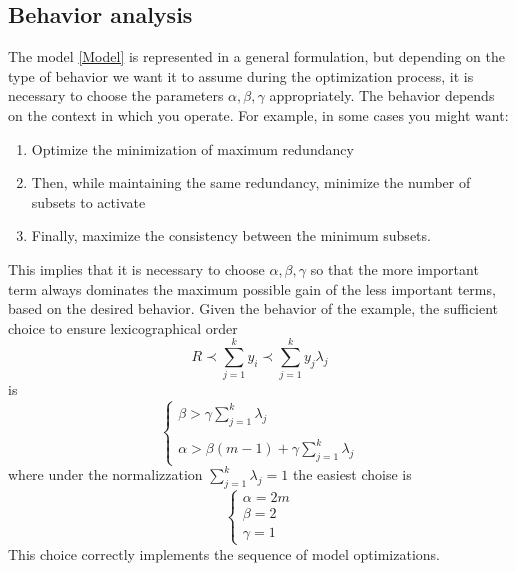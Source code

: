 \documentclass[10pt]{article} %
\begin{document}
\subsection{Behavior analysis}
The model \ref{Model} is represented in a general formulation, but depending on the type of behavior we want it to assume during the optimization process, it is necessary to choose the parameters $\alpha, \beta, \gamma$ appropriately. The behavior depends on the context in which you operate. For example, in some cases you might want:
\begin{enumerate}
    \item Optimize the minimization of maximum redundancy
    \item Then, while maintaining the same redundancy, minimize the number of subsets to activate
    \item Finally, maximize the consistency between the minimum subsets.
\end{enumerate}
This implies that it is necessary to choose $\alpha, \beta, \gamma$ so that the more important term always dominates the maximum possible gain of the less important terms, based on the desired behavior. Given the behavior of the example, the sufficient choice to ensure lexicographical order
\begin{equation}
    R \prec \sum_{j=1}^{k} y_{i} \prec \sum_{j=1}^{k} y_{j}\lambda_{j}
\end{equation}
is
\begin{equation}
    \begin{cases}
    \beta >  \gamma \sum_{j=1}^{k} \lambda_{j} \\\\
    \alpha > \beta(m-1) +\gamma\sum_{j=1}^{k} \lambda_{j}
\end{cases}
\end{equation}
where under the normalizzation $\sum_{j=1}^{k}\lambda _{j} = 1$ the easiest choise is
\begin{equation}
    \begin{cases}
        \alpha = 2m \\
        \beta = 2 \\
        \gamma = 1
    \end{cases}
\end{equation}
This choice correctly implements the sequence of model optimizations.
\end{document}
